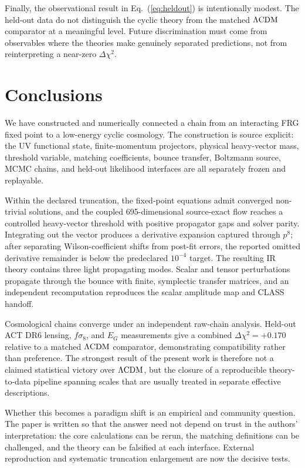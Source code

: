 \documentclass[12pt]{iopart}
\newcommand{\LCDM}{\Lambda{\rm CDM}}
\begin{document}
Finally, the observational result in Eq.~(\ref{eq:heldout}) is intentionally modest.  The held-out data do not distinguish the cyclic theory from the matched $\LCDM$ comparator at a meaningful level.  Future discrimination must come from observables where the theories make genuinely separated predictions, not from reinterpreting a near-zero $\Delta\chi^2$.

\section{Conclusions}
\label{sec:conclusions}

We have constructed and numerically connected a chain from an interacting FRG fixed point to a low-energy cyclic cosmology.  The construction is source explicit: the UV functional state, finite-momentum projectors, physical heavy-vector mass, threshold variable, matching coefficients, bounce transfer, Boltzmann source, MCMC chains, and held-out likelihood interfaces are all separately frozen and replayable.

Within the declared truncation, the fixed-point equations admit converged non-trivial solutions, and the coupled 695-dimensional source-exact flow reaches a controlled heavy-vector threshold with positive propagator gaps and solver parity.  Integrating out the vector produces a derivative expansion captured through $p^8$; after separating Wilson-coefficient shifts from post-fit errors, the reported omitted derivative remainder is below the predeclared $10^{-4}$ target.  The resulting IR theory contains three light propagating modes.  Scalar and tensor perturbations propagate through the bounce with finite, symplectic transfer matrices, and an independent recomputation reproduces the scalar amplitude map and CLASS handoff.

Cosmological chains converge under an independent raw-chain analysis.  Held-out ACT DR6 lensing, $f\sigma_8$, and $E_G$ measurements give a combined $\Delta\chi^2=+0.170$ relative to a matched $\LCDM$ comparator, demonstrating compatibility rather than preference.  The strongest result of the present work is therefore not a claimed statistical victory over $\LCDM$, but the closure of a reproducible theory-to-data pipeline spanning scales that are usually treated in separate effective descriptions.

Whether this becomes a paradigm shift is an empirical and community question.  The paper is written so that the answer need not depend on trust in the authors' interpretation: the core calculations can be rerun, the matching definitions can be challenged, and the theory can be falsified at each interface.  External reproduction and systematic truncation enlargement are now the decisive tests.
\end{document}
